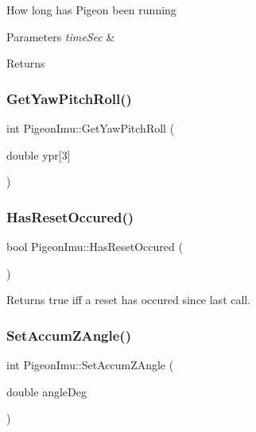 How long has Pigeon been running 


\begin{DoxyParams}{Parameters}
{\em time\+Sec} & \\
\hline
\end{DoxyParams}
\begin{DoxyReturn}{Returns}

\end{DoxyReturn}
\mbox{\label{class_pigeon_imu_a56f727c87eebb80d0c3803f95137d72d}} 
\subsubsection{\texorpdfstring{Get\+Yaw\+Pitch\+Roll()}{GetYawPitchRoll()}}
{\footnotesize\ttfamily int Pigeon\+Imu\+::\+Get\+Yaw\+Pitch\+Roll (\begin{DoxyParamCaption}\item[{double}]{ypr\mbox{[}3\mbox{]} }\end{DoxyParamCaption})}

\mbox{\label{class_pigeon_imu_a0cd34c3c78fe5032c9daa80b0f56f307}} 
\subsubsection{\texorpdfstring{Has\+Reset\+Occured()}{HasResetOccured()}}
{\footnotesize\ttfamily bool Pigeon\+Imu\+::\+Has\+Reset\+Occured (\begin{DoxyParamCaption}{ }\end{DoxyParamCaption})}

\begin{DoxyReturn}{Returns}
true iff a reset has occured since last call. 
\end{DoxyReturn}
\mbox{\label{class_pigeon_imu_ab1c1a0f830c12f3c84c181ca9970033a}} 
\subsubsection{\texorpdfstring{Set\+Accum\+Z\+Angle()}{SetAccumZAngle()}}
{\footnotesize\ttfamily int Pigeon\+Imu\+::\+Set\+Accum\+Z\+Angle (\begin{DoxyParamCaption}\item[{double}]{angle\+Deg }\end{DoxyParamCaption})}

